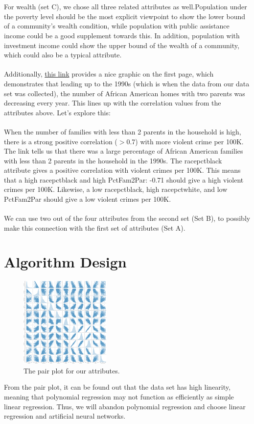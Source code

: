 \documentclass[letterpaper, 11 pt, conference]{article}
\begin{document}
\\
\\For wealth (set C), we chose all three related attributes as well.Population under the poverty level should be the most explicit viewpoint to show the lower bound of a community's wealth condition, while population with public assistance income could be a good supplement towards this. In addition, population with investment income could show the upper bound of the wealth of a community, which could also be a typical attribute.
\\
\\Additionally, 
\href{https://www.census.gov/prod/1/statbrief/sb93_2.pdf}{this link} provides a nice graphic on the first page, which demonstrates that leading up to the 1990s (which is when the data from our data set was collected), the number of African American homes with two parents was decreasing every year. This lines up with the correlation values from the attributes above. Let's explore this:
\\
\\When the number of families with less than 2 parents in the household is high, there is a strong positive correlation ($>$0.7) with more violent crime per 100K. The link tells us that there was a large percentage of African American families with less than 2 parents in the household in the 1990s. The racepctblack attribute gives a positive correlation with violent crimes per 100K. This means that a high racepctblack and high PctFam2Par: -0.71 should give a high violent crimes per 100K. Likewise, a low racepctblack, high racepctwhite, and low PctFam2Par should give a low violent crimes per 100K.
\\
\\We can use two out of the four attributes from the second set (Set B), to possibly make this connection with the first set of attributes (Set A).

\section{Algorithm Design}
 
\begin{figure}[H]
\centering
\includegraphics[width=0.4\textwidth]{pairplot.png}
\caption{\label{fig:pairplot}The pair plot for our attributes.}
\end{figure}
From the pair plot, it can be found out that the data set has high linearity, meaning that polynomial regression may not function as efficiently as simple linear regression. Thus, we will abandon polynomial regression and choose linear regression and artificial neural networks.
\end{document}
